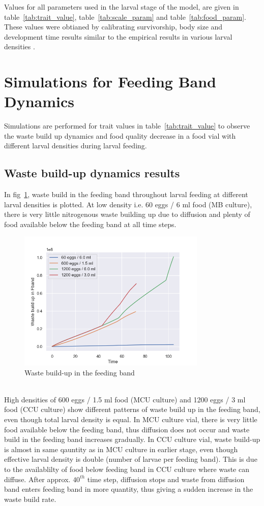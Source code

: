 \noindent Values for all parameters used in the larval stage of the model, are given in table~\ref{tab:trait_value}, table~\ref{tab:scale_param} and table~\ref{tab:food_param}. These values were obtianed by calibrating survivorship, body size and development time results similar to the empirical results in various larval densities \cite{sarangiEcologicalDetailsMediate2018}.
\newpage
\section{Simulations for Feeding Band Dynamics}
Simulations are performed for trait values in table~\ref{tab:trait_value} to observe the waste build up dynamics and food quality decrease in a food vial with different larval densities during larval feeding.
\subsection{Waste build-up dynamics results}
In fig~\ref{fig:waste}, waste build in the feeding band throughout larval feeding at different larval densities is plotted. At low density i.e. 60 eggs / 6 ml food (MB culture), there is very little nitrogenous waste building up due to diffusion and plenty of food available below the feeding band at all time steps.
\begin{figure}[h]
  \centering
  \includegraphics[width=0.8\textwidth]{C2/Figs/waste_build_up}
  \caption{Waste build-up in the feeding band}
  \label{fig:waste}
\end{figure}\\
\noindent High densities of 600 eggs / 1.5 ml food (MCU culture) and 1200 eggs / 3 ml food (CCU culture) show different patterns of waste build up in the feeding band, even though total larval density is equal. In MCU culture vial, there is very little food available below the feeding band, thus diffusion does not occur and waste build in the feeding band increases gradually. In CCU culture vial, waste build-up is almost in same qauntity as in MCU culture in earlier stage, even though effective larval density is double (number of larvae per feeding band). This is due to the availablilty of food below feeding band in CCU culture where waste can diffuse. After approx. $40^{th}$ time step, diffusion stops and waste from diffusion band enters feeding band in more quantity, thus giving a sudden increase in the waste build rate. \\

